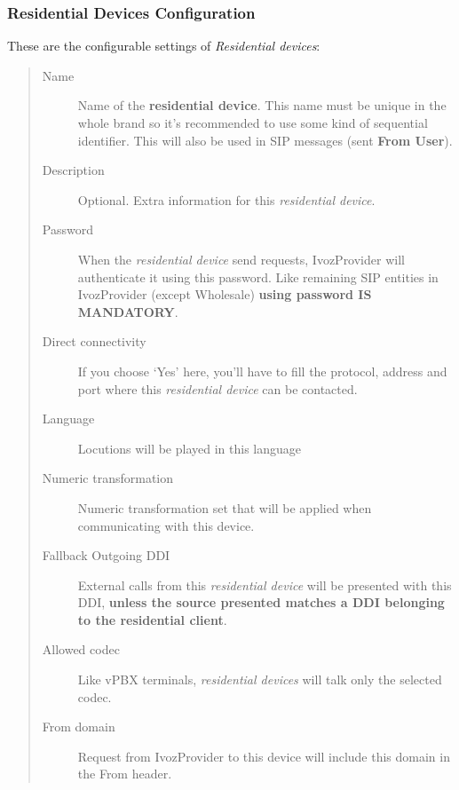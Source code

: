 \documentclass[letterpaper,10pt,spanish]{sphinxmanual}
\begin{document}
\subsubsection{Residential Devices Configuration}
\label{administration_portal/client/residential/residential_devices:residential-devices-configuration}
These are the configurable settings of \emph{Residential devices}:
\begin{quote}
\begin{description}
\item[{Name}] \leavevmode
Name of the \textbf{residential device}. This name must be unique in the whole brand so
it's recommended to use some kind of sequential identifier. This will also be used
in SIP messages (sent \textbf{From User}).

\item[{Description}] \leavevmode
Optional. Extra information for this \emph{residential device}.

\item[{Password}] \leavevmode
When the \emph{residential device} send requests, IvozProvider will authenticate it using
this password. Like remaining SIP entities in IvozProvider (except Wholesale) \textbf{using password IS MANDATORY}.

\item[{Direct connectivity}] \leavevmode
If you choose `Yes' here, you'll have to fill the protocol, address and
port where this \emph{residential device} can be contacted.

\item[{Language}] \leavevmode
Locutions will be played in this language

\item[{Numeric transformation}] \leavevmode
Numeric transformation set that will be applied when communicating with this device.

\item[{Fallback Outgoing DDI}] \leavevmode
External calls from this \emph{residential device} will be presented with this DDI, \textbf{unless
the source presented matches a DDI belonging to the residential client}.

\item[{Allowed codec}] \leavevmode
Like vPBX terminals, \emph{residential devices} will talk only the selected codec.

\item[{From domain}] \leavevmode
Request from IvozProvider to this device will include this domain in
the From header.


\end{description}
\end{quote}
\end{document}
